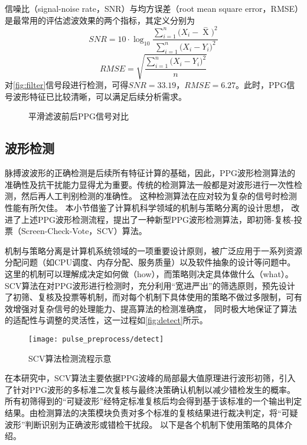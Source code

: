 信噪比（signal-noise rate，SNR）与均方误差（root mean square error，RMSE）是最常用的评估滤波效果的两个指标，其定义分别为
\begin{equation}
    \label{equ:snr}
    SNR=10 \cdot \log_{10}\frac{\sum_{i=1}^{n}{(X_i-\mathop{X} \limits^-})^2}{\sum_{i=1}^{n}{(X_i-Y_i})^2}
\end{equation}
\begin{equation}
    \label{equ:rmse}
    RMSE=\sqrt{\frac{\sum_{i=1}^{n}{(X_i-Y_i})^2}{n}}
\end{equation}
对\autoref{fig:filter}信号段进行检测，可得$SNR=33.19$，$RMSE=6.27$。此时，PPG信号波形特征已比较清晰，可以满足后续分析需求。
\begin{figure}[htbp]
    \centering
    \quad
    \caption{\label{fig:filter}平滑滤波前后PPG信号对比}
\end{figure}

\subsection{波形检测}
脉搏波波形的正确检测是后续所有特征计算的基础，因此，PPG波形检测算法的准确性及抗干扰能力显得尤为重要。传统的检测算法一般都是对波形进行一次性检测，然后再人工判别检测的准确性。
这种检测算法在应对较为复杂的信号时检测性能有所欠佳。
本小节借鉴了计算机科学领域的机制与策略分离的设计思想，
改进了上述PPG波形检测流程，提出了一种新型PPG波形检测算法，即初筛-复核-投票（Screen-Check-Vote，SCV）算法。

机制与策略分离是计算机系统领域的一项重要设计原则，被广泛应用于一系列资源分配问题（如CPU调度、内存分配、服务质量）以及软件抽象的设计等问题中\cite{Wulf1974,Levin1975,Brinch2001}。
这里的机制可以理解成决定如何做（how），而策略则决定具体做什么（what）。
SCV算法在对PPG波形进行检测时，充分利用“宽进严出”的筛选原则，预先设计了初筛、复核及投票等机制，而对每个机制下具体使用的策略不做过多限制，可有效增强对复杂信号的处理能力、提高算法的检测准确度，
同时极大地保证了算法的适配性与调整的灵活性，这一过程如\autoref{fig:detect}所示。
\begin{figure}[htbp]
    \centering
    \texttt{[image: pulse\_preprocess/detect]}
    \caption{\label{fig:detect}SCV算法检测流程示意}
\end{figure}

在本研究中，SCV算法主要依据PPG波峰的局部最大值原理进行波形初筛，引入了针对PPG波形的多标准二次复核与最终决策确认机制以减少错检发生的概率。
所有初筛得到的“可疑波形”经特定标准复核后均会得到基于该标准的一个输出判定结果。由检测算法的决策模块负责对多个标准的复核结果进行裁决判定，将“可疑波形”判断识别为正确波形或错检干扰段。
以下是各个机制下使用策略的具体介绍。

